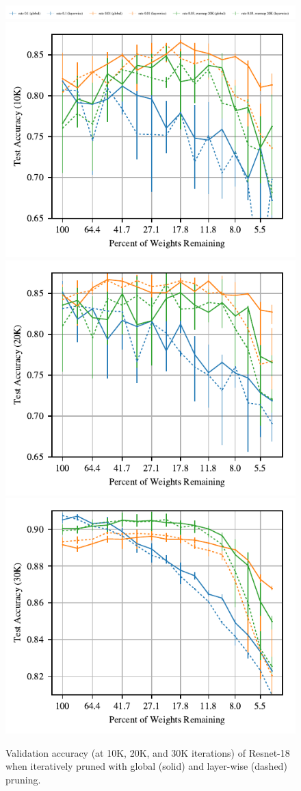 \begin{figure}
\centering
\vspace{-.5em}
\includegraphics[width=.7\textwidth]{graphs/cifar10/icml/resnet18-iclr-layerwise-10000/legend}
\includegraphics[width=.33\textwidth]{graphs/cifar10/icml/resnet18-iclr-layerwise-10000/accuracy}%
\includegraphics[width=.33\textwidth]{graphs/cifar10/icml/resnet18-iclr-layerwise-20000/accuracy}%
\includegraphics[width=.33\textwidth]{graphs/cifar10/icml/resnet18-iclr-layerwise-29900/accuracy}%
\vspace{-1em}
\caption{Validation accuracy (at 10K, 20K, and 30K iterations) of Resnet-18 when iteratively pruned with global (solid) and layer-wise (dashed) pruning.}
\label{fig:layerwise-vs-global-resnet}
\end{figure}

